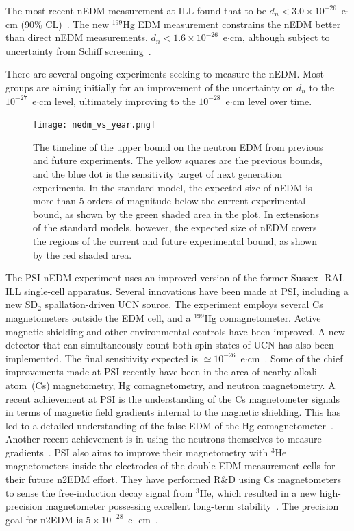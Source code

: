 The most recent nEDM measurement at ILL found that to be
$d_n< 3.0 \times 10^{-26}$~e$\cdot$cm (90\%
CL)~\cite{pendlebury2015revised}. The new $^{199}$Hg EDM measurement
constrains the nEDM better than direct nEDM measurements,
$d_n < 1.6 \times 10^{-26}$~e$\cdot$cm, although subject to
uncertainty from Schiff screening~\cite{graner2016reduced}.

There are several ongoing experiments seeking to measure the
nEDM. Most groups are aiming initially for an improvement of the
uncertainty on $d_n$ to the $10^{-27}$~e$\cdot$cm level, ultimately
improving to the $10^{-28}$~e$\cdot$cm level over time.


\begin{figure}[h!]
  \centering
  \texttt{[image: nedm\_vs\_year.png]}
  \caption[History of nEDM measurement]{The timeline of the upper
    bound on the neutron EDM from previous and future experiments. The
    yellow squares are the previous bounds, and the blue dot is the
    sensitivity target of next generation experiments.  In the
    standard model, the expected size of nEDM is more than 5 orders of
    magnitude below the current experimental bound, as shown by the
    green shaded area in the plot. In extensions of the standard
    models, however, the expected size of nEDM covers the regions of
    the current and future experimental bound, as shown by the red
    shaded area.~\cite{yoon2018neutron} }
  \label{fig:nEDMhistory}
\end{figure}

The PSI nEDM experiment uses an improved version of the former Sussex-
RAL-ILL single-cell apparatus. Several innovations have been made at
PSI, including a new SD$_2$ spallation-driven UCN source. The
experiment employs several Cs magnetometers outside the EDM cell, and
a $^{199}$Hg comagnetometer. Active magnetic shielding and other
environmental controls have been improved. A new detector that can
simultaneously count both spin states of UCN has also been
implemented. The final sensitivity expected is
$\simeq 10^{-26}$~e$\cdot$cm~\cite{Schmidt2016}. Some of the chief
improvements made at PSI recently have been in the area of nearby
alkali atom~(Cs) magnetometry, Hg comagnetometry, and neutron
magnetometry. A recent achievement at PSI is the understanding of the
Cs magnetometer signals in terms of magnetic field gradients internal
to the magnetic shielding. This has led to a detailed understanding of
the false EDM of the Hg comagnetometer~\cite{Afach2015_2}. Another
recent achievement is in using the neutrons themselves to measure
gradients~\cite{Afach2015_3}. PSI also aims to improve their
magnetometry with $^3$He magnetometers inside the electrodes of the
double EDM measurement cells for their future n2EDM effort. They have
performed R\&D using Cs magnetometers to sense the free-induction
decay signal from $^3$He, which resulted in a new high-precision
magnetometer possessing excellent long-term
stability~\cite{Koch2015}. The precision goal for n2EDM is
$5 \times 10^{-28}$~e$\cdot$ cm~\cite{Bernhard_talk,baker2011search}.


